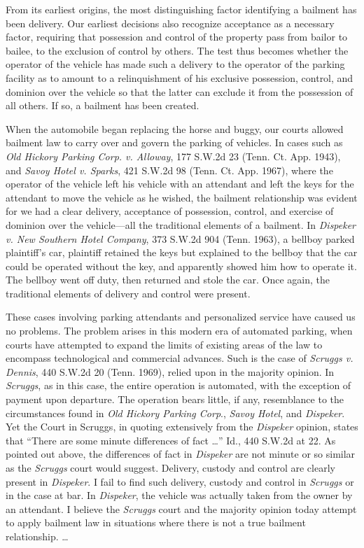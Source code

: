 From its earliest origins, the most distinguishing factor identifying a bailment
has been delivery. Our earliest decisions also recognize acceptance as a
necessary factor, requiring that possession and control of the property pass
from bailor to bailee, to the exclusion of control by others. The test thus
becomes whether the operator of the vehicle has made such a delivery to the
operator of the parking facility as to amount to a relinquishment of his
exclusive possession, control, and dominion over the vehicle so that the latter
can exclude it from the possession of all others. If so, a bailment has been
created.

When the automobile began replacing the horse and buggy, our courts allowed
bailment law to carry over and govern the parking of vehicles. In cases such as
\textit{Old Hickory Parking Corp. v. Alloway}, 177 S.W.2d 23 (Tenn. Ct. App.
1943), and \textit{Savoy Hotel v. Sparks}, 421 S.W.2d 98 (Tenn. Ct. App. 1967),
where the operator of the vehicle left his vehicle with an attendant and left
the keys for the attendant to move the vehicle as he wished, the bailment
relationship was evident for we had a clear delivery, acceptance of possession,
control, and exercise of dominion over the vehicle---all the traditional
elements of a bailment. In \textit{Dispeker v. New Southern Hotel Company}, 373
S.W.2d 904 (Tenn. 1963), a bellboy parked plaintiff's car, plaintiff retained
the keys but explained to the bellboy that the car could be operated without
the key, and apparently showed him how to operate it. The bellboy went off
duty, then returned and stole the car. Once again, the traditional elements of
delivery and control were present.

These cases involving parking attendants and personalized service have caused us
no problems. The problem arises in this modern era of automated parking, when
courts have attempted to expand the limits of existing areas of the law to
encompass technological and commercial advances. Such is the case of
\textit{Scruggs v. Dennis}, 440 S.W.2d 20 (Tenn. 1969), relied upon in the
majority opinion. In \textit{Scruggs}, as in this case, the entire operation is
automated, with the exception of payment upon departure. The operation bears
little, if any, resemblance to the circumstances found in \textit{Old Hickory
Parking Corp}., \textit{Savoy Hotel}, and \textit{Dispeker}. Yet the Court in
Scruggs, in quoting extensively from the \textit{Dispeker} opinion, states that
``There are some minute differences of fact \ldots'' Id., 440 S.W.2d at 22. As
pointed out above, the differences of fact in \textit{Dispeker} are not minute
or so similar as the \textit{Scruggs} court would suggest. Delivery, custody
and control are clearly present in \textit{Dispeker}. I fail to find such
delivery, custody and control in \textit{Scruggs} or in the case at bar. In
\textit{Dispeker}, the vehicle was actually taken from the owner by an
attendant. I believe the \textit{Scruggs} court and the majority opinion today
attempt to apply bailment law in situations where there is not a true bailment
relationship. \ldots

